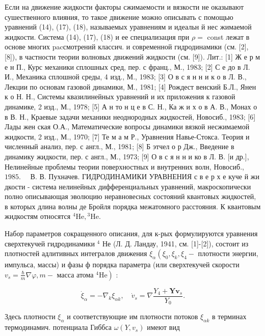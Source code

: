 \documentclass[10pt]{article}
\begin{document}
Если на движение жидкости факторы сжимаемости и вязкости не оказывают сушественного влияния, то такое движение можно описывать с помощью уравнений (14), (17), (18), называемых уравнениям и идеальн й нес жимаемой жидкости. Система (14), (17), (18) и ее специализация при $\rho=$ const лежат в основе многих pacсмотрений классич. и современной гидродинамики (см. [2], [8]), в частности теории волновых движений жидкости (см. [9]). Лит.: [1] Ж е р м е н П., Курс механики сплошных сред, пер. с франц., М., 1983; [2] С е до в Л. И., Механика сплошной среды, 4 изд., М., 1983; [3] О в с я н н и к о в Л. В., Лекции по основам газовой динамики, М., 1981; [4] Рождест венский Б.Л., Янен к о Н. Н., Системы квазилинейных уравнений и их приложения к газовой динамике, 2 изд., М., 1978; [5] А н то н ц е в С. Н., Ка ж и х о в А. В., Монах о в В. Н., Краевые задачи механики неоднородных жидкостей, Новосиб., 1983; [6] Лады жен ская О.А., Математические вопросы динамики вязкой несжимаемой жидкости, 2 изд., М., 1970; [7] Те м а м Р., Уравнения Навье-Стокса. Теория и численный анализ, пер. с англ., М., 1981; [8] Б этчел о р Дж., Введение в динамику жидкости, пер. с англ., М., 1973; [9] О в с я н н и ко в Л. В. [и др.], Нелинейные проблемы теории поверхностных и внутренних волн, Новосиб., $1985 . \quad$ В. В. Пухначев. ГИДРОДИНАМИКИ УРАВНЕНИЯ с в е р х е куче й жи дкости - система нелинейных дифференциальных уравнений, макроскопически полно описывающая эволюцию неравновесных состояний квантовых жидкостей, в которых длина волны де Бройля порядка межатомного расстояния. К квантовым жидкостям относятся ${ }^{4} \mathrm{He},{ }^{3} \mathrm{He}$.



Набор параметров сокращенного описания, для к-рых формулируются уравнения сверхтекучей гидродинамики ${ }^{4}$ Не (Л. Д. Ландау, 1941, см. [1]-[2]), состоит из плотностей адлитивных интегралов движения $\xi_{\alpha}\left(\xi_{0}, \xi_{k}, \xi_{4}-\right.$ плотности энергии, импульса, массы) и фазы ф порядка параметра (или сверхтекучей скорости $v_{s}=\frac{\hbar}{m} \nabla \varphi, m-$ масса атома $\left.{ }^{4} \mathrm{He}\right)$ :



\[

\dot{\xi}_{\alpha}=-\nabla_{k} \xi_{\alpha k}, \quad \dot{v}_{s}=\nabla \frac{Y_{4}+\boldsymbol{Y} \boldsymbol{v}_{s}}{Y_{0}} .

\]



Здесь плотности $\xi_{\alpha}$ и соответствующие им плотности потоков $\xi_{\alpha k}$ в терминах термодинамич. потенциала Гиббса $\omega\left(Y, v_{s}\right)$ имеют вид
\end{document}
